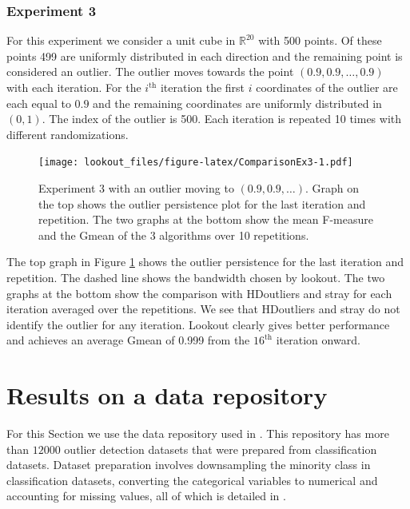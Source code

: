 \documentclass[11pt,a4paper,]{article}
\theoremstyle{definition}
\theoremstyle{definition}
\theoremstyle{definition}
\theoremstyle{remark}
\begin{document}
\hypertarget{experiment-3}{%
\subsubsection*{Experiment 3}\label{experiment-3}}

For this experiment we consider a unit cube in \(\mathbb{R}^{20}\) with 500 points. Of these points 499 are uniformly distributed in each direction and the remaining point is considered an outlier. The outlier moves towards the point \(\left( 0.9, 0.9, \dots, 0.9 \right)\) with each iteration. For the \(i^{\text{th}}\) iteration the first \(i\) coordinates of the outlier are each equal to \(0.9\) and the remaining coordinates are uniformly distributed in \((0,1)\). The index of the outlier is 500. Each iteration is repeated 10 times with different randomizations.

\begin{figure}
\centering
\texttt{[image: lookout\_files/figure-latex/ComparisonEx3-1.pdf]}
\caption{\label{fig:ComparisonEx3}Experiment 3 with an outlier moving to \((0.9, 0.9, \dots)\). Graph on the top shows the outlier persistence plot for the last iteration and repetition. The two graphs at the bottom show the mean F-measure and the Gmean of the 3 algorithms over 10 repetitions.}
\end{figure}

The top graph in Figure \ref{fig:ComparisonEx3} shows the outlier persistence for the last iteration and repetition. The dashed line shows the bandwidth chosen by lookout. The two graphs at the bottom show the comparison with HDoutliers and stray for each iteration averaged over the repetitions. We see that HDoutliers and stray do not identify the outlier for any iteration. Lookout clearly gives better performance and achieves an average Gmean of 0.999 from the \(16^{\text{th}}\) iteration onward.

\hypertarget{sec:applications}{%
\section{Results on a data repository}\label{sec:applications}}

For this Section we use the data repository used in \textcite{datasets}. This repository has more than \(12000\) outlier detection datasets that were prepared from classification datasets. Dataset preparation involves downsampling the minority class in classification datasets, converting the categorical variables to numerical and accounting for missing values, all of which is detailed in \textcite{normalizationoutliers}.
\end{document}
